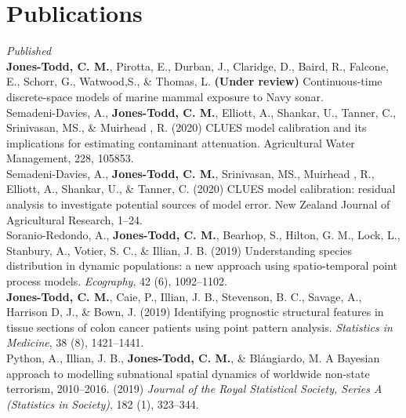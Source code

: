 \documentclass[10pt,a4paper]{moderncv}
\begin{document}
  \section{Publications}
  \vspace{5pt}

  \textit{\small{Published}}\\

   \textbf{Jones-Todd, C. M.}, Pirotta, E., Durban, J., Claridge, D., Baird, R., Falcone, E., Schorr, G., Watwood,S., \& Thomas, L.  \textbf{(Under review)} Continuous-time discrete-space models of marine mammal exposure to Navy sonar.\\
 
   Semadeni-Davies, A., \textbf{Jones-Todd, C. M.},  Elliott, A., Shankar, U., Tanner, C., Srinivasan, MS., \& Muirhead , R. (2020) CLUES model calibration and its implications for estimating contaminant attenuation. Agricultural Water Management, 228, 105853.\\

    Semadeni-Davies, A., \textbf{Jones-Todd, C. M.}, Srinivasan, MS.,  Muirhead , R.,  Elliott, A., Shankar, U., \& Tanner, C. (2020) CLUES model calibration: residual analysis to investigate potential sources of model error. New Zealand Journal of Agricultural Research, 1--24.\\

Soranio-Redondo, A., \textbf{Jones-Todd, C. M.}, Bearhop, S., Hilton, G. M., Lock, L., Stanbury, A., Votier, S. C., \& Illian, J. B. (2019) Understanding species distribution in dynamic populations: a new approach using spatio-temporal point process models. \textit{Ecography}, 42 (6), 1092--1102.\\
  
\vspace{-3pt}
\textbf{Jones-Todd, C. M.}, Caie, P., Illian, J. B., Stevenson, B. C., Savage, A., Harrison D, J., \& Bown, J. (2019) Identifying prognostic structural features in tissue sections of colon cancer patients using point pattern analysis. \textit{Statistics in Medicine}, 38 (8), 1421--1441.\\

\vspace{-3pt}
Python, A.,  Illian, J. B., \textbf{Jones-Todd, C. M.}, \& Bl\'{a}ngiardo, M. A Bayesian approach to modelling subnational spatial dynamics of worldwide non-state terrorism, 2010--2016. (2019) \textit{Journal of the Royal Statistical Society, Series  A (Statistics in Society)}, 182 (1), 323--344.\\
\end{document}
